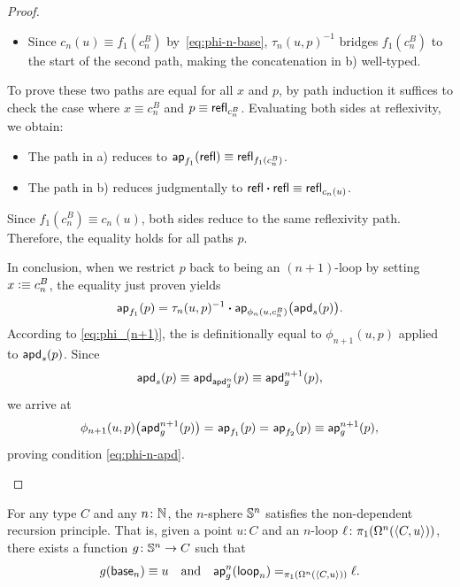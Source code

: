 \begin{proof}
\begin{description}[font=\normalfont\scshape]
\begin{enumerate}[a),font=\upshape]
\begin{itemize}
                \item Since $c_n(u)\equiv f_1(c_n^B)$ by~\eqref{eq:phi-n-base}, $\tau_n(u,p)^{-1}$ bridges $f_1(c_n^B)$ to the start of the second path, making the concatenation in b) well-typed.
            \end{itemize}

            To prove these two paths are equal for all $x$ and $p$, by path induction it suffices to check the case where $x\equiv c_n^B$ and $p\equiv\mathsf{refl}_{c_n^B}$. Evaluating both sides at reflexivity, we obtain:
            \begin{itemize}
                \item The path in a) reduces to $\mathsf{ap}_{f_1}(\mathsf{refl})\equiv\mathsf{refl}_{f_1(c_n^B)}$.

                \item The path in b) reduces judgmentally to $\mathsf{refl}\mathbin{\boldsymbol{\cdot}}\mathsf{refl}\equiv\mathsf{refl}_{c_n(u)}$.
            \end{itemize}
            Since $f_1(c_n^B)\equiv c_n(u)$, both sides reduce to the same reflexivity path. Therefore, the equality holds for all paths $p$.

            In conclusion, when we restrict $p$ back to being an $(n+1)$-loop by setting $x\mathrel{\vcentcolon}\equiv c_n^B$, the equality just proven yields
            \[
                \mathsf{ap}_{f_1}(p) = \tau_n(u,p)^{-1} \mathbin{\boldsymbol{\cdot}} \mathsf{ap}_{\phi_n(u,c_n^B)}\bigl(\mathsf{apd}_s(p)\bigr).
            \]
            According to \eqref{eq:phi_(n+1)}, the \rhs is definitionally equal to $\phi_{n+1}(u,p)$ applied to $\mathsf{apd}_s(p)$. Since
            \[
                \mathsf{apd}_s(p)
                    \equiv\mathsf{apd}_{\mathsf{apd}^n_g}(p)
                    \equiv\mathsf{apd}^{n+1}_g(p),
            \]
            we arrive at
            \[
                \phi_{n+1}(u,p)
                    \bigl(
                        \mathsf{apd}^{n+1}_g(p)
                    \bigr)
                    \mathrel{=_{}}\mathsf{ap}_{f_1}(p)
                    \mathrel{=_{}}\mathsf{ap}_{f_2}(p)
                    \equiv \mathsf{ap}^{n+1}_g(p),
            \]
            proving condition \eqref{eq:phi-n-apd}.
        \end{enumerate}
    \end{description}
\end{proof}

\begin{thm}\label{thm:sn-recursion}
    For any type\/ $C$ and any\/ $n\colon\N$, the\/ $n$-sphere\/ $\mathbb S^n$ satisfies the non-dependent recursion principle. That is, given a point\/ $u\colon C$ and an\/ $n$-loop\/ $\ell\colon\pi_1(\Omega^n(\dep{C,u}))$, there exists a function\/ $g\colon\sphere^n\to C$ such that
    \[
        g(\mathsf{base}_n) \equiv u
        \quad\text{and}\quad
        \mathsf{ap}^n_g(\mathsf{loop}_n) \mathrel{=_{\pi_1(\Omega^n(\langle C,u\rangle))}} \ell.
    \]
\end{thm}

